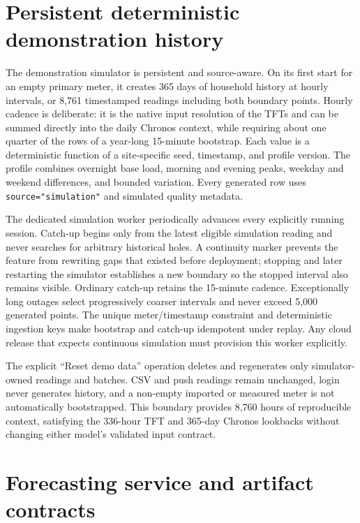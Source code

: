 \section{Persistent deterministic demonstration history}

The demonstration simulator is persistent and source-aware. On its first start for an empty primary meter, it creates 365 days of household history at hourly intervals, or 8,761 timestamped readings including both boundary points. Hourly cadence is deliberate: it is the native input resolution of the TFTs and can be summed directly into the daily Chronos context, while requiring about one quarter of the rows of a year-long 15-minute bootstrap. Each value is a deterministic function of a site-specific seed, timestamp, and profile version. The profile combines overnight base load, morning and evening peaks, weekday and weekend differences, and bounded variation. Every generated row uses \texttt{source="simulation"} and simulated quality metadata.

The dedicated simulation worker periodically advances every explicitly running session. Catch-up begins only from the latest eligible simulation reading and never searches for arbitrary historical holes. A continuity marker prevents the feature from rewriting gaps that existed before deployment; stopping and later restarting the simulator establishes a new boundary so the stopped interval also remains visible. Ordinary catch-up retains the 15-minute cadence. Exceptionally long outages select progressively coarser intervals and never exceed 5,000 generated points. The unique meter/timestamp constraint and deterministic ingestion keys make bootstrap and catch-up idempotent under replay. Any cloud release that expects continuous simulation must provision this worker explicitly.

The explicit ``Reset demo data'' operation deletes and regenerates only simulator-owned readings and batches. CSV and push readings remain unchanged, login never generates history, and a non-empty imported or measured meter is not automatically bootstrapped. This boundary provides 8,760 hours of reproducible context, satisfying the 336-hour TFT and 365-day Chronos lookbacks without changing either model's validated input contract.

\section{Forecasting service and artifact contracts}

